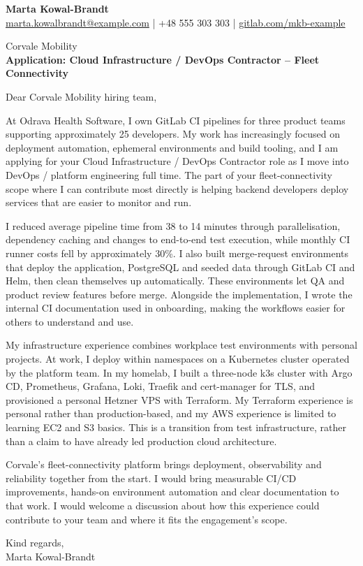 \documentclass[11pt,a4paper]{article}
\begin{document}
{\Large\bfseries\color{primarycolor} Marta Kowal-Brandt}\\
{\small \href{mailto:marta.kowalbrandt@example.com}{marta.kowalbrandt@example.com} | +48 555 303 303 | \href{https://gitlab.com/mkb-example}{gitlab.com/mkb-example}}

Corvale Mobility\\
\textbf{Application: Cloud Infrastructure / DevOps Contractor -- Fleet Connectivity}

Dear Corvale Mobility hiring team,

At Odrava Health Software, I own GitLab CI pipelines for three product teams supporting approximately 25 developers. My work has increasingly focused on deployment automation, ephemeral environments and build tooling, and I am applying for your Cloud Infrastructure / DevOps Contractor role as I move into DevOps / platform engineering full time. The part of your fleet-connectivity scope where I can contribute most directly is helping backend developers deploy services that are easier to monitor and run.

I reduced average pipeline time from 38 to 14 minutes through parallelisation, dependency caching and changes to end-to-end test execution, while monthly CI runner costs fell by approximately 30\%. I also built merge-request environments that deploy the application, PostgreSQL and seeded data through GitLab CI and Helm, then clean themselves up automatically. These environments let QA and product review features before merge. Alongside the implementation, I wrote the internal CI documentation used in onboarding, making the workflows easier for others to understand and use.

My infrastructure experience combines workplace test environments with personal projects. At work, I deploy within namespaces on a Kubernetes cluster operated by the platform team. In my homelab, I built a three-node k3s cluster with Argo CD, Prometheus, Grafana, Loki, Traefik and cert-manager for TLS, and provisioned a personal Hetzner VPS with Terraform. My Terraform experience is personal rather than production-based, and my AWS experience is limited to learning EC2 and S3 basics. This is a transition from test infrastructure, rather than a claim to have already led production cloud architecture.

Corvale's fleet-connectivity platform brings deployment, observability and reliability together from the start. I would bring measurable CI/CD improvements, hands-on environment automation and clear documentation to that work. I would welcome a discussion about how this experience could contribute to your team and where it fits the engagement's scope.

Kind regards,\\
Marta Kowal-Brandt
\end{document}
